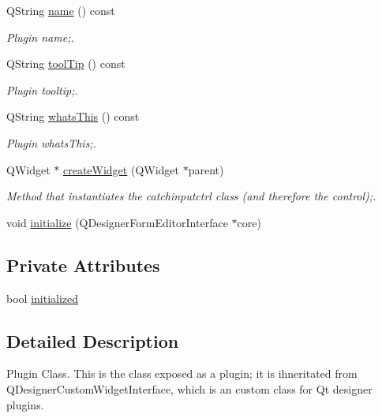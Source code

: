 \begin{DoxyCompactItemize}
QString \hyperlink{class_catch_input_ctrl_plugin_aa238f9656fda644bf61f061b9eb296fb}{name} () const 
\begin{DoxyCompactList}\small\item\em Plugin name;. \item\end{DoxyCompactList}\item 
QString \hyperlink{class_catch_input_ctrl_plugin_a66815b8920b223db303bfde2bc9997f1}{toolTip} () const 
\begin{DoxyCompactList}\small\item\em Plugin tooltip;. \item\end{DoxyCompactList}\item 
QString \hyperlink{class_catch_input_ctrl_plugin_adb249d9957a8144c004f939efd5c6f42}{whatsThis} () const 
\begin{DoxyCompactList}\small\item\em Plugin whatsThis;. \item\end{DoxyCompactList}\item 
QWidget $\ast$ \hyperlink{class_catch_input_ctrl_plugin_a6327b5527f7124b0093f0b8d3030d77c}{createWidget} (QWidget $\ast$parent)
\begin{DoxyCompactList}\small\item\em Method that instantiates the catchinputctrl class (and therefore the control);. \item\end{DoxyCompactList}\item 
void \hyperlink{class_catch_input_ctrl_plugin_af074e338042ad431cced1f03ad42d9b9}{initialize} (QDesignerFormEditorInterface $\ast$core)
\end{DoxyCompactItemize}
\subsection*{Private Attributes}
\begin{DoxyCompactItemize}
\item 
bool \hyperlink{class_catch_input_ctrl_plugin_ac3600bda2c53684e37b1890b9371f720}{initialized}
\end{DoxyCompactItemize}


\subsection{Detailed Description}
Plugin Class. This is the class exposed as a plugin; it is ihneritated from QDesignerCustomWidgetInterface, which is an custom class for Qt designer plugins. 

